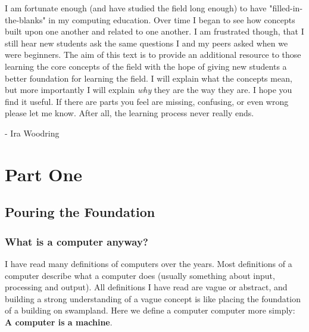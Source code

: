 \documentclass[11pt,fleqn]{book} %
\begin{document}
I am fortunate enough (and have studied the field long enough) to have "filled-in-the-blanks" in my computing education.  Over time I began to see how concepts built upon one another and related to one another.  I am frustrated though, that I still hear new students ask the same questions I and my peers asked when we were beginners.  The aim of this text is to provide an additional resource to those learning the core concepts of the field with the hope of giving new students a better foundation for learning the field.  I will explain what the concepts mean, but more importantly I will explain \textit{why} they are the way they are.  I hope you find it useful.  If there are parts you feel are missing, confusing, or even wrong please let me know.  After all, the learning process never really ends.

- Ira Woodring 



\part{Part One}



\chapter{Pouring the Foundation}

\section{What is a computer anyway?}

I have read many definitions of computers over the years.  Most definitions of a computer describe what a computer  does (usually something about input, processing and output).  All definitions I have read are vague or abstract, and building a strong understanding of a vague concept is like placing the foundation of a building on swampland.  Here we define a computer \gls{computer} more simply:  \textbf{A computer is a machine}.
\end{document}
